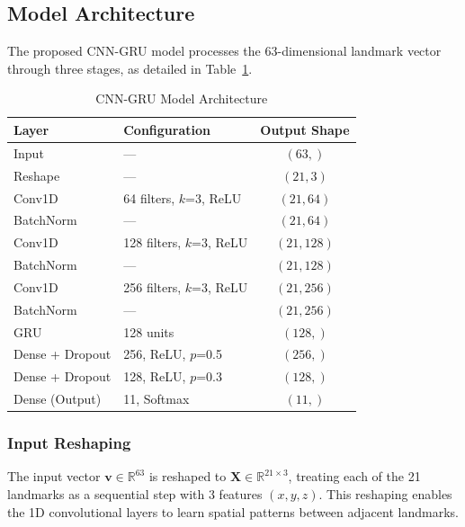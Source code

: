 \documentclass[conference]{IEEEtran}
\begin{document}
\subsection{Model Architecture}

The proposed CNN-GRU model processes the 63-dimensional landmark vector through three stages, as detailed in Table~\ref{tab:model_arch}.

\begin{table}[htbp]
\caption{CNN-GRU Model Architecture}
\label{tab:model_arch}
\centering
\begin{tabular}{@{}llc@{}}
\toprule
\textbf{Layer} & \textbf{Configuration} & \textbf{Output Shape} \\
\midrule
Input            & —                          & $(63,)$ \\
Reshape          & —                          & $(21, 3)$ \\
\midrule
Conv1D           & 64 filters, $k$=3, ReLU    & $(21, 64)$ \\
BatchNorm        & —                          & $(21, 64)$ \\
Conv1D           & 128 filters, $k$=3, ReLU   & $(21, 128)$ \\
BatchNorm        & —                          & $(21, 128)$ \\
Conv1D           & 256 filters, $k$=3, ReLU   & $(21, 256)$ \\
BatchNorm        & —                          & $(21, 256)$ \\
\midrule
GRU              & 128 units                  & $(128,)$ \\
\midrule
Dense + Dropout  & 256, ReLU, $p$=0.5         & $(256,)$ \\
Dense + Dropout  & 128, ReLU, $p$=0.3         & $(128,)$ \\
Dense (Output)   & 11, Softmax                & $(11,)$ \\
\bottomrule
\end{tabular}
\end{table}

\subsubsection{Input Reshaping}
The input vector $\mathbf{v} \in \mathbb{R}^{63}$ is reshaped to $\mathbf{X} \in \mathbb{R}^{21 \times 3}$, treating each of the 21 landmarks as a sequential step with 3 features $(x, y, z)$. This reshaping enables the 1D convolutional layers to learn spatial patterns between adjacent landmarks.
\end{document}
